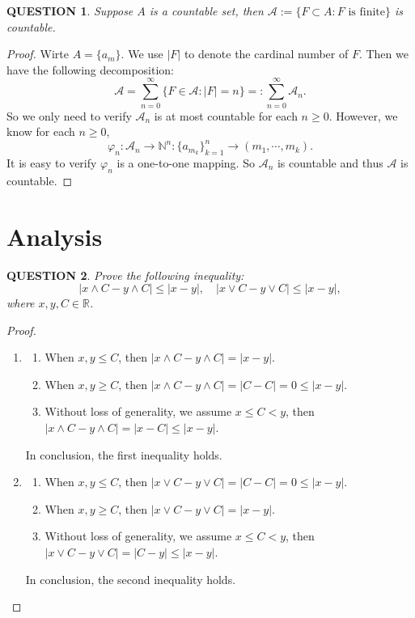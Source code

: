 \documentclass[12pt]{article}
\renewcommand{\(}{\left(}%
\renewcommand{\)}{\right)}%
\renewcommand{\[}{\left[}%
\renewcommand{\]}{\right]}%
\renewcommand{\r}{\mathbb{R}}
\renewcommand{\a}{\mathscr{A}}
\newcommand{\n}{\mathbb{N}}
\newtheorem{question}{QUESTION}[section]}
\newtheorem{proof}{Proof.}}
\begin{document}
  \begin{question}
   Suppose $A$ is a countable set, then $\a:=\{F\subset A: F\text{ is finite}  \}$ is countable.
  \end{question}
  \begin{proof}
   Wirte $A=\{a_m\}$. We use $|F|$ to denote the cardinal number of $F$. Then we have the following decomposition:
   \begin{equation*}
    \a=\sum_{n=0}^\infty \{F\in\a:|F|=n\}=:\sum_{n=0}^\infty \a_n.
   \end{equation*}
   So we only need to verify $\a_n$ is at most countable for each $n\geq 0$. However, we know for each $n\geq 0$,
   \begin{equation*}
    \varphi_n: \a_n\to \n^n:\{a_{m_k}\}_{k=1}^n\to (m_1,\cdots,m_k ).
   \end{equation*}
   It is easy to verify $\varphi_n$ is a one-to-one mapping. So $\a_n$ is countable and thus $\a$ is countable.
  \end{proof}

  \section{Analysis}
  \begin{question}
   Prove the following inequality:
   \begin{equation*}
    |x\wedge C-y\wedge C|\leq |x-y|,\quad |x\vee C-y\vee C|\leq |x-y|,
   \end{equation*}
   where $x,y,C\in\r$.
  \end{question}
   \begin{proof}
    \begin{enumerate}
     \item \begin{enumerate}
     \item When $x,y\leq  C$, then $|x\wedge C-y\wedge C|= |x-y|$.
     \item When $x,y\geq C$, then $|x\wedge C-y\wedge C|=|C-C|=0\leq |x-y|$.
     \item Without loss of generality, we assume $x\leq C<y$, then $|x\wedge C-y\wedge C|=|x-C|\leq |x-y|$.
    \end{enumerate}
    In conclusion, the first inequality holds.
     \item \begin{enumerate}
     \item When $x,y\leq  C$, then $|x\vee C-y\vee C|= |C-C|=0\leq |x-y|$.
     \item When $x,y\geq C$, then $|x\vee C-y\vee C|= |x-y|$.
     \item Without loss of generality, we assume $x\leq C<y$, then $|x\vee C-y\vee C|=|C-y|\leq |x-y|$.
    \end{enumerate}
    In conclusion, the second inequality holds.
    \end{enumerate}
   \end{proof}
   
\end{document}

